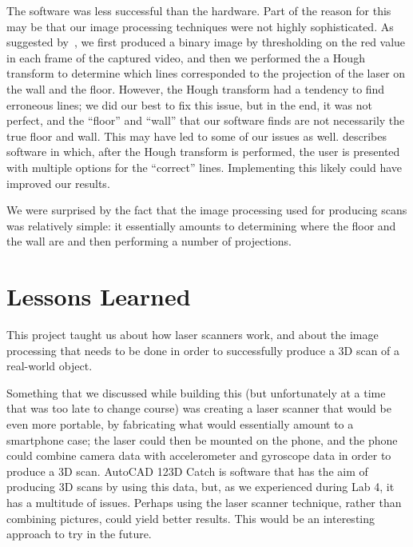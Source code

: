 \documentclass[12pt, letterpaper]{article}
\begin{document}
The software was less successful than the hardware. Part of the reason for this
may be that our image processing techniques were not highly sophisticated. As
suggested by~\cite{instructions}, we first produced a binary image by thresholding
on the red value in each frame of the captured video, and then we performed the
a Hough transform to determine which lines corresponded to the projection of
the laser on the wall and the floor. However, the Hough transform had a
tendency to find erroneous lines; we did our best to fix this issue, but in
the end, it was not perfect, and the ``floor'' and ``wall'' that our software
finds are not necessarily the true floor and wall. This may have led to some
of our issues as well. \cite{instructions} describes software in which, after
the Hough transform is performed, the user is presented with multiple options
for the ``correct'' lines. Implementing this likely could have improved our results.

We were surprised by the fact that the image processing used for producing scans
was relatively simple: it essentially amounts to determining where the floor and
the wall are and then performing a number of projections.

\section{Lessons Learned}

This project taught us about how laser scanners work, and about the image processing
that needs to be done in order to successfully produce a 3D scan of a real-world object.

Something that we discussed while building this (but unfortunately at a time that
was too late to change course) was creating a laser scanner that would be even more
portable, by fabricating what would essentially amount to a smartphone case; the laser
could then be mounted on the phone, and the phone could combine camera data with
accelerometer and gyroscope data in order to produce a 3D scan. AutoCAD 123D Catch
is software that has the aim of producing 3D scans by using this data, but, as we
experienced during Lab 4, it has a multitude of issues. Perhaps using the laser
scanner technique, rather than combining pictures, could yield better results.
This would be an interesting approach to try in the future.
\end{document}
